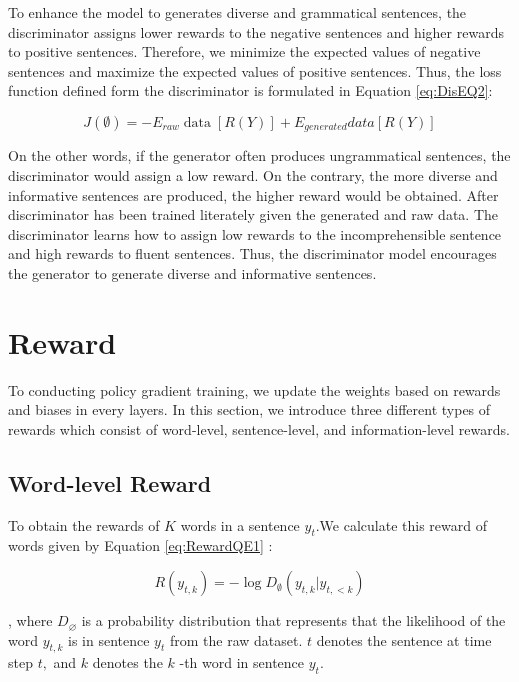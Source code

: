 To enhance the model to generates diverse and grammatical sentences,  the discriminator assigns lower rewards to the negative sentences and higher rewards to positive sentences. Therefore, we minimize the expected values of negative sentences and maximize the expected values of positive sentences. Thus, the loss function defined form the discriminator is formulated in Equation \ref{eq:DisEQ2}:

\begin{equation} \label{eq:DisEQ2}
J(\emptyset)=-E_{r a w} \operatorname{data}[R(Y)]+E_{g e n e r a t e d} d a t a[R(Y)]
\end{equation}

On the other words, if the generator often produces ungrammatical sentences, the discriminator would assign a low reward. On the contrary, the more diverse and informative sentences are produced, the higher reward would be obtained. After discriminator has been trained literately given the generated and raw data. The discriminator learns how to assign low rewards to the incomprehensible sentence and high rewards to fluent sentences. Thus, the discriminator model encourages the generator to generate diverse and informative sentences.

\section{Reward}

To conducting policy gradient training, we update the weights based on rewards and biases in every layers. In this section, we introduce three different types of rewards which consist of word-level, sentence-level, and information-level rewards.
\subsection{Word-level Reward}

To obtain the rewards of $K$ words in a sentence $y_{t}$.We calculate this reward of words given by Equation \ref{eq:RewardQE1} :

\begin{equation}\label{eq:RewardQE1}
R\left(y_{t, k}\right)=-\log D_{\emptyset}\left(y_{t, k} | y_{t,<k}\right)
\end{equation}

, where $D_{\varnothing}$ is a probability distribution that represents that the
likelihood of the word $y_{t, k}$ is in sentence $y_{t}$ from the raw dataset. $t$
denotes the sentence at time step $t,$ and $k$ denotes the $k$ -th word in
sentence $y_{t} .$

